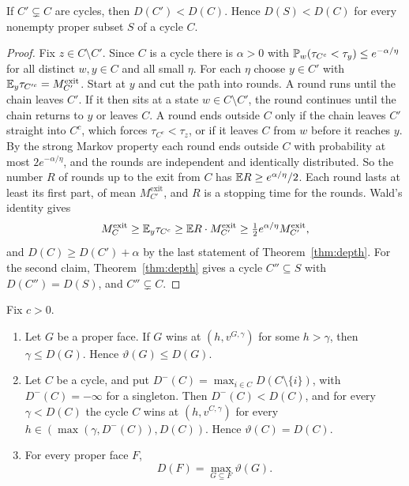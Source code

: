 \begin{lemma}\label{lem:nested}
If $C'\subsetneq C$ are cycles, then $D(C')<D(C)$. Hence $D(S)<D(C)$ for every
nonempty proper subset $S$ of a cycle $C$.
\end{lemma}

\ifarxivbuild
\begin{proof}
Fix $z\in C\setminus C'$. Since $C$ is a cycle there is $\alpha>0$ with
$\mathbb{P}_w(\tau_{C^c}<\tau_y)\le e^{-\alpha/\eta}$ for all distinct $w,y\in C$ and
all small $\eta$. For each $\eta$ choose $y\in C'$ with
$\mathbb{E}_y\tau_{C'^c}=M^{\mathrm{exit}}_{C'}$. Start at $y$ and cut the path into
rounds. A round runs until the chain leaves $C'$. If it then sits at a state
$w\in C\setminus C'$, the round continues until the chain returns to $y$ or
leaves $C$. A round ends outside $C$ only if the chain leaves $C'$ straight into
$C^c$, which forces $\tau_{C^c}<\tau_z$, or if it leaves $C$ from $w$ before it
reaches $y$. By the strong Markov property each round ends outside $C$ with
probability at most $2e^{-\alpha/\eta}$, and the rounds are independent and
identically distributed. So the number $R$ of rounds up to the exit from $C$ has
$\mathbb{E} R\ge e^{\alpha/\eta}/2$. Each round lasts at least its first part, of mean
$M^{\mathrm{exit}}_{C'}$, and $R$ is a stopping time for the rounds. Wald's
identity gives
\[
 M^{\mathrm{exit}}_C\ge\mathbb{E}_y\tau_{C^c}\ge\mathbb{E} R\cdot M^{\mathrm{exit}}_{C'}
 \ge\tfrac12e^{\alpha/\eta}M^{\mathrm{exit}}_{C'} ,
\]
and $D(C)\ge D(C')+\alpha$ by the last statement of Theorem~\ref{thm:depth}.
For the second claim, Theorem~\ref{thm:depth} gives a cycle $C''\subseteq S$
with $D(C'')=D(S)$, and $C''\subsetneq C$.
\end{proof}
\else

\fi

\begin{theorem}\label{thm:attraction}
Fix $c>0$.
\begin{enumerate}
\item[(a)] Let $G$ be a proper face. If $G$ wins at $(h,v^{G,\gamma})$ for some
$h>\gamma$, then $\gamma\le D(G)$. Hence $\vartheta(G)\le D(G)$.
\item[(b)] Let $C$ be a cycle, and put $D^-(C)=\max_{i\in C}D(C\setminus\{i\})$,
with $D^-(C)=-\infty$ for a singleton. Then $D^-(C)<D(C)$, and for every
$\gamma<D(C)$ the cycle $C$ wins at $(h,v^{C,\gamma})$ for every
$h\in(\max(\gamma,D^-(C)),D(C))$. Hence $\vartheta(C)=D(C)$.
\item[(c)] For every proper face $F$,
\[
 D(F)=\max_{G\subseteq F}\vartheta(G).
\]
\end{enumerate}
\end{theorem}

